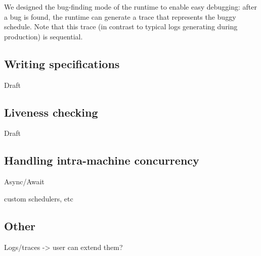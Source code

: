 We designed the bug-finding mode of the \psharp runtime to enable easy debugging: after a bug is found, the runtime can generate a trace that represents the buggy schedule. Note that this trace (in contrast to typical logs generating during production) is sequential.

\subsection{Writing specifications}
\label{sec:psharp:specs}

Draft

\subsection{Liveness checking}
\label{sec:psharp:liveness}

Draft

\subsection{Handling intra-machine concurrency}
\label{sec:psharp:async}

Async/Await

custom schedulers, etc

\subsection{Other}
\label{sec:psharp:other}

Logs/traces -> user can extend them?

